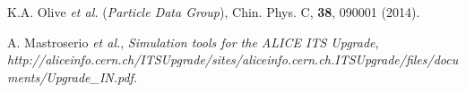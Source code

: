 \begin{thebibliography}{00}
 K.A. Olive {\it et al.} ({\it Particle Data Group}), Chin. Phys. C, {\bf 38}, 090001 (2014). 

 A. Mastroserio {\it et al.}, {\it Simulation tools for the ALICE ITS Upgrade}, 
{\small{\it http://aliceinfo.cern.ch/ITSUpgrade/sites/aliceinfo.cern.ch.ITSUpgrade/files/documents/Upgrade\_IN.pdf}}.

\end{thebibliography}

